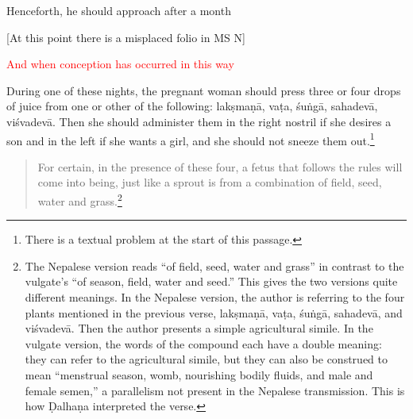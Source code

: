 \begin{translation}
        
 \item [31]

Henceforth, he should approach after a month

[At this point there is a misplaced folio in MS N]
  
\item[32] 

\textcolor{red}{And when conception has occurred in this 
way}\q{\textcolor{red}{Problematic 
passage in the edition.}}

During one of these nights, the pregnant woman should press three or
four drops of juice from one or other of the following:
\gls{lakṣmaṇā}, \gls{vaṭa}, \gls{śuṅgā}, \gls{sahadevā},
\gls{viśvadevā}. Then she should administer them in the right nostril if she
desires a son and in the left if she wants a girl, and she should not
sneeze them out.\footnote{There is a textual problem at the start of this 
passage.}




\item[33]

\begin{quote}
    For certain, in the presence of these four, a fetus that follows
the rules will come into being, just like a sprout is from a
combination of field, seed, water and grass.\footnote{The Nepalese
    version reads  “of field, seed, water
    and grass” in contrast to the vulgate's 
    “of season, field, water and seed.” This gives the two versions
    quite different meanings. In the Nepalese version, the author is
    referring to the four plants mentioned in the previous verse,
    \gls{lakṣmaṇā}, \gls{vaṭa}, \gls{śuṅgā}, \gls{sahadevā}, and
    \gls{viśvadevā}.  Then the author presents a simple agricultural
    simile.  In the vulgate version, the words of the compound each
    have a double meaning: they can refer to the agricultural simile,
    but they can also be construed to mean “menstrual season, womb,
    nourishing bodily fluids, and male and female semen,” a
    parallelism not present in the Nepalese transmission.   This is
    how Ḍalhaṇa interpreted the verse.}
\end{quote}

\item[34] 


\end{translation}
